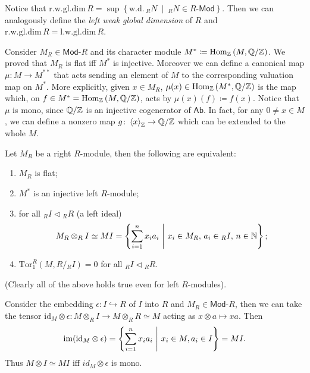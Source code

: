 \begin{rem}[]
	Notice that $\mathrm{r.w.gl.dim}\, R = \sup \left\{ \mathrm{w.d.}\, {}_RN \ \middle|\ {}_RN \in R\text{-}\mathsf{Mod} \right\}$.
	Then we can analogously define the {\em left weak global dimension} of $R$
	and $\mathrm{r.w.gl.dim}\, R = \mathrm{l.w.gl.dim}\, R$.
\end{rem}

\begin{rem}[]
	Consider $M_R \in \mathsf{Mod}\text{-}R$
	and its character module $M^* \coloneqq \mathrm{Hom}_{\mathbb{Z}}\left( M, \mathbb{Q}/\mathbb{Z} \right)$.
	We proved that $M_R$ is flat iff $M^*$ is injective.
	Moreover we can define a canonical map $\mu\colon M \to M^{**}$ that
	acts sending an element of $M$ to the corresponding valuation map on $M^*$.
	More explicitly, given $x \in M_R$, 
	$\mu(x) \in \mathrm{Hom}_{ \mathbb{Z}}\left( M^*, \mathbb{Q}/\mathbb{Z} \right)$
	is the map which, on $f \in M^* = \mathrm{Hom}_{\mathbb{Z}}\left( M, \mathbb{Q}/\mathbb{Z} \right)$,
	acts by $\mu(x) (f) \coloneqq f(x)$.
	Notice that $\mu$ is mono, since $\mathbb{Q}/\mathbb{Z}$ is an injective cogenerator of $\mathsf{Ab}$.
	In fact, for any $0 \neq x \in M$, we can define a nonzero map
	$g\colon \left\langle x \right\rangle_{\mathbb{Z}} \to \mathbb{Q}/\mathbb{Z}$
	which can be extended to the whole $M$.
\end{rem}

\begin{prop}
	Let $M_R$ be a right $R$-module, then the following are equivalent:
	\begin{enumerate}
		\item $M_R$ is flat;
		\item $M^*$ is an injective left $R$-module;
		\item for all ${}_RI \triangleleft {}_RR$ (a left ideal)
			\begin{equation}
			M_R \otimes_R I \simeq MI =
			\left\{ \sum_{i=1}^{n} x_i a_i \ \middle|\ x_i \in M_R,\, a_i \in {}_RI,\, n \in \mathbb{N} \right\}
			;\end{equation} 
		\item $\mathrm{Tor}^R_1(M, R/{}_RI) = 0$ for all ${}_RI \triangleleft {}_RR$.
	\end{enumerate}
	(Clearly all of the above holds true even for left $R$-modules).
\end{prop} 

\begin{rem}[]
	Consider the embedding $\epsilon\colon I \hookrightarrow R$ of $I$ into $R$
	and $M_R \in \mathsf{Mod}\text{-}R$,
	then we can take the tensor
	$\mathrm{id}_{ M } \otimes \epsilon\colon M \otimes_R I \to M \otimes_R R \simeq M$ acting as
	$x \otimes a \mapsto xa$.
	Then
	\begin{equation}
		\operatorname{im} (\mathrm{id}_{ M } \otimes \epsilon) =
		\left\{ \sum_{i=1}^{n} x_ia_i \ \middle|\ x_i \in M, a_i \in I \right\} =
		MI
	.\end{equation} 
	Thus $M \otimes I \simeq MI$ iff $id_M \otimes \epsilon$ is mono.
\end{rem}


